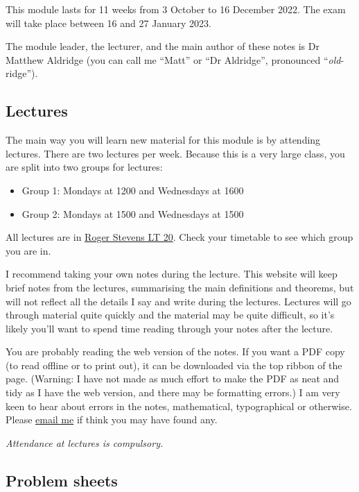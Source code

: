 \documentclass[
  letterpaper,
  DIV=11,
  numbers=noendperiod]{scrreprt}
\providecommand{\tightlist}{%
  \setlength{\itemsep}{0pt}\setlength{\parskip}{0pt}}\usepackage{longtable,booktabs,array}
\theoremstyle{remark}
\begin{document}
This module lasts for 11 weeks from 3 October to 16 December 2022. The
exam will take place between 16 and 27 January 2023.

The module leader, the lecturer, and the main author of these notes is
Dr Matthew Aldridge (you can call me ``Matt'' or ``Dr Aldridge'',
pronounced ``\emph{old}-ridge'').

\hypertarget{lectures}{%
\subsection*{Lectures}\label{lectures}}

The main way you will learn new material for this module is by attending
lectures. There are two lectures per week. Because this is a very large
class, you are split into two groups for lectures:

\begin{itemize}
\tightlist
\item
  Group 1: Mondays at 1200 and Wednesdays at 1600
\item
  Group 2: Mondays at 1500 and Wednesdays at 1500
\end{itemize}

All lectures are in
\href{https://students.leeds.ac.uk/rooms?type=room\&id=100044}{Roger
Stevens LT 20}. Check your timetable to see which group you are in.

I recommend taking your own notes during the lecture. This website will
keep brief notes from the lectures, summarising the main definitions and
theorems, but will not reflect all the details I say and write during
the lectures. Lectures will go through material quite quickly and the
material may be quite difficult, so it's likely you'll want to spend
time reading through your notes after the lecture.

You are probably reading the web version of the notes. If you want a PDF
copy (to read offline or to print out), it can be downloaded via the top
ribbon of the page. (Warning: I have not made as much effort to make the
PDF as neat and tidy as I have the web version, and there may be
formatting errors.) I am very keen to hear about errors in the notes,
mathematical, typographical or otherwise. Please
\href{mailto:m.aldridge@leeds.ac.uk}{email me} if think you may have
found any.

\emph{Attendance at lectures is compulsory.}

\hypertarget{problem-sheets}{%
\subsection*{Problem sheets}\label{problem-sheets}}
\end{document}
